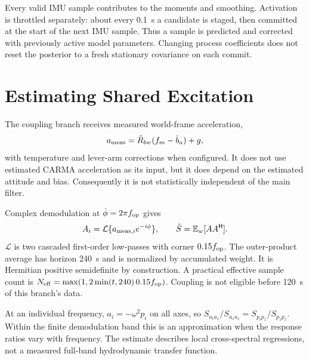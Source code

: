 \documentclass[conference]{IEEEtran}
\newcommand{\vc}[1]{\bm{#1}}
\newcommand{\mt}[1]{\bm{#1}}
\newcommand{\E}{\mathbb E}
\newcommand{\herm}{^{\mathsf H}}
\begin{document}
Every valid IMU sample contributes to the moments and smoothing.
Activation is throttled separately: about every 0.1~s a candidate is
staged, then committed at the start of the next IMU sample. Thus a sample
is predicted and corrected with previously active model parameters.
Changing process coefficients does not reset the posterior to a fresh
stationary covariance on each commit.

\section{Estimating Shared Excitation}
\label{sec:crossestimate}
The coupling branch receives measured world-frame acceleration,
\begin{equation}
 \vc a_{\rm meas}=\hat{\mt R}_{bw}(\vc f_m-\hat{\vc b}_a)+\vc g,
 \label{eq:ameas}
\end{equation}
with temperature and lever-arm corrections when configured. It does not
use estimated CARMA acceleration as its input, but it does depend on the
estimated attitude and bias. Consequently it is not statistically
independent of the main filter.

Complex demodulation at $\dot\phi=2\pi f_{\rm op}$ gives
\begin{equation}
 A_i=\mathcal L\{a_{{\rm meas},i}e^{-i\phi}\},\qquad
 \hat{\mt S}=\E_w[\vc A\vc A\herm].
 \label{eq:demod}
\end{equation}
$\mathcal L$ is two cascaded first-order low-passes with corner
$0.15f_{\rm op}$. The outer-product average has horizon 240~s and is
normalized by accumulated weight. It is Hermitian positive semidefinite
by construction. A practical effective sample count is
$N_{\rm eff}=\max(1,2\min(t,240)\,0.15f_{\rm op})$.
Coupling is not eligible before 120~s of this branch's data.

At an individual frequency, $a_i=-\omega^2p_i$ on all axes, so
$S_{a_i a_z}/S_{a_z a_z}=S_{p_i p_z}/S_{p_zp_z}$.
Within the finite demodulation band this is an approximation when the
response ratios vary with frequency. The estimate describes local
cross-spectral regressions, not a measured full-band hydrodynamic transfer
function.
\end{document}
